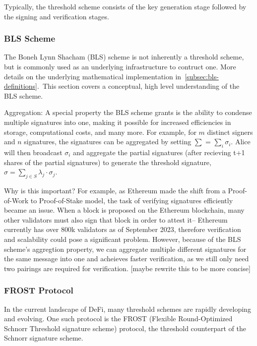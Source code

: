 \documentclass[12pt]{article}
\begin{document}
Typically, the threshold scheme consists of the key generation stage followed by the signing and verification stages. 

\subsubsection{BLS Scheme}

The Boneh Lynn Shacham (BLS) scheme is not inherently a threshold scheme, but is commonly used as an underlying infrastructure to contruct one. More details on the underlying mathematical implementation in~\ref{subsec:bls-definitions}.\ This section covers a conceptual, high level understanding of the BLS scheme.

Aggregation: A special property the BLS scheme grants is the ability to condense multiple signatures into one, making it possible for increased efficiencies in storage, computational costs, and many more. For example, for \(m\) distinct signers and \(n\) signatures, the signatures can be aggregated by setting \( \sum \) = \( \sum_i \)\( \sigma_i \). Alice will then broadcast \( \sigma_i \) and aggregate the partial signatures (after recieving t+1 shares of the partial signatures) to generate the threshold signature, \( \sigma = \sum_{j \in S} \lambda_j \cdot \sigma_j \).

Why is this important? For example, as Ethereum made the shift from a Proof-of-Work to Proof-of-Stake model, the task of verifying signatures efficiently became an issue. When a block is proposed on the Ethereum blockchain, many other validators must also sign that block in order to attest it-- Ethereum currently has over 800k validators as of September 2023, therefore verification and scalability could pose a significant problem. However, because of the BLS scheme's aggregtion property, we can aggregate multiple different signatures for the same message into one and acheieves faster verification, as we still only need two pairings are required for verification. [maybe rewrite this to be more concise]

\subsubsection{FROST Protocol}
In the current landscape of DeFi, many threshold schemes are rapidly developing and evolving. One such protocol is the FROST (Flexible Round-Optimized Schnorr Threshold signature scheme) protocol, the threshold counterpart of the Schnorr signature scheme. 
\end{document}
